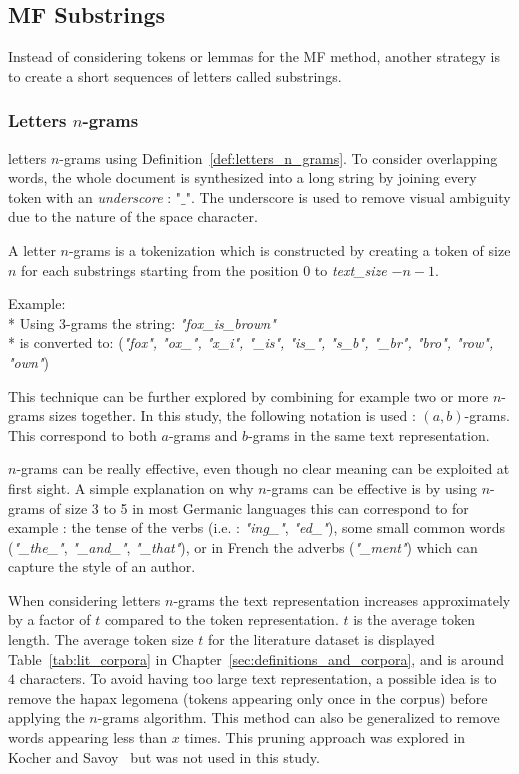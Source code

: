 \subsection{MF Substrings \label{sec:substrings}}

Instead of considering tokens or lemmas for the MF method, another strategy is to create a short sequences of letters called substrings.

\subsubsection{Letters $n$-grams}

letters $n$-grams using Definition~\ref{def:letters_n_grams}.
To consider overlapping words, the whole document is synthesized into a long string by joining every token with an \textit{underscore} : "$\_$".
The underscore is used to remove visual ambiguity due to the nature of the space character.

\begin{definition}
  A letter $n$-grams is a tokenization which is constructed by creating a token of size $n$ for each substrings starting from the position $0$ to \textit{text\_size} $- n - 1$.

  Example: \\*
  Using 3-grams the string: \textit{"fox\_is\_brown"} \\*
  is converted to: (\textit{"fox", "ox\_", "x\_i", "\_is", "is\_", "s\_b", "\_br", "bro", "row", "own"})
\end{definition}

This technique can be further explored by combining for example two or more $n$-grams sizes together.
In this study, the following notation is used : $(a, b)$-grams.
This correspond to both $a$-grams and $b$-grams in the same text representation.

$n$-grams can be really effective, even though no clear meaning can be exploited at first sight.
A simple explanation on why $n$-grams can be effective is by using $n$-grams of size 3 to 5 in most Germanic languages this can correspond to for example : the tense of the verbs (i.e. : \textit{"ing\_"}, \textit{"ed\_"}), some small common words (\textit{"\_the\_"}, \textit{"\_and\_"}, \textit{"\_that"}), or in French the adverbs (\textit{"\_ment"}) which can capture the style of an author.

When considering letters $n$-grams the text representation increases approximately by a factor of $t$ compared to the token representation.
$t$ is the average token length.
The average token size $t$ for the literature dataset is displayed Table~\ref{tab:lit_corpora} in Chapter~\ref{sec:definitions_and_corpora}, and is around $4$ characters.
To avoid having too large text representation, a possible idea is to remove the hapax legomena (tokens appearing only once in the corpus) before applying the $n$-grams algorithm.
This method can also be generalized to remove words appearing less than $x$ times.
This pruning approach was explored in Kocher and Savoy~\cite{kocher_linking} but was not used in this study.

